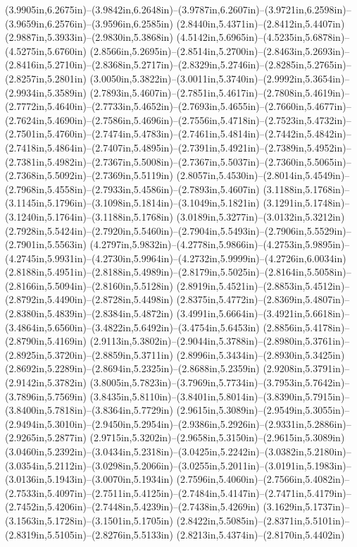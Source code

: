 (3.9905in,6.2675in)--(3.9842in,6.2648in)--(3.9787in,6.2607in)--(3.9721in,6.2598in)--(3.9659in,6.2576in)--(3.9596in,6.2585in) (2.8440in,5.4371in)--(2.8412in,5.4407in) (2.9887in,5.3933in)--(2.9830in,5.3868in) (4.5142in,5.6965in)--(4.5235in,5.6878in)--(4.5275in,5.6760in) (2.8566in,5.2695in)--(2.8514in,5.2700in)--(2.8463in,5.2693in)--(2.8416in,5.2710in)--(2.8368in,5.2717in)--(2.8329in,5.2746in)--(2.8285in,5.2765in)--(2.8257in,5.2801in) (3.0050in,5.3822in)--(3.0011in,5.3740in)--(2.9992in,5.3654in)--(2.9934in,5.3589in) (2.7893in,5.4607in)--(2.7851in,5.4617in)--(2.7808in,5.4619in)--(2.7772in,5.4640in)--(2.7733in,5.4652in)--(2.7693in,5.4655in)--(2.7660in,5.4677in)--(2.7624in,5.4690in)--(2.7586in,5.4696in)--(2.7556in,5.4718in)--(2.7523in,5.4732in)--(2.7501in,5.4760in)--(2.7474in,5.4783in)--(2.7461in,5.4814in)--(2.7442in,5.4842in)--(2.7418in,5.4864in)--(2.7407in,5.4895in)--(2.7391in,5.4921in)--(2.7389in,5.4952in)--(2.7381in,5.4982in)--(2.7367in,5.5008in)--(2.7367in,5.5037in)--(2.7360in,5.5065in)--(2.7368in,5.5092in)--(2.7369in,5.5119in) (2.8057in,5.4530in)--(2.8014in,5.4549in)--(2.7968in,5.4558in)--(2.7933in,5.4586in)--(2.7893in,5.4607in) (3.1188in,5.1768in)--(3.1145in,5.1796in)--(3.1098in,5.1814in)--(3.1049in,5.1821in) (3.1291in,5.1748in)--(3.1240in,5.1764in)--(3.1188in,5.1768in) (3.0189in,5.3277in)--(3.0132in,5.3212in) (2.7928in,5.5424in)--(2.7920in,5.5460in)--(2.7904in,5.5493in)--(2.7906in,5.5529in)--(2.7901in,5.5563in) (4.2797in,5.9832in)--(4.2778in,5.9866in)--(4.2753in,5.9895in)--(4.2745in,5.9931in)--(4.2730in,5.9964in)--(4.2732in,5.9999in)--(4.2726in,6.0034in) (2.8188in,5.4951in)--(2.8188in,5.4989in)--(2.8179in,5.5025in)--(2.8164in,5.5058in)--(2.8166in,5.5094in)--(2.8160in,5.5128in) (2.8919in,5.4521in)--(2.8853in,5.4512in)--(2.8792in,5.4490in)--(2.8728in,5.4498in) (2.8375in,5.4772in)--(2.8369in,5.4807in)--(2.8380in,5.4839in)--(2.8384in,5.4872in) (3.4991in,5.6664in)--(3.4921in,5.6618in)--(3.4864in,5.6560in)--(3.4822in,5.6492in)--(3.4754in,5.6453in) (2.8856in,5.4178in)--(2.8790in,5.4169in) (2.9113in,5.3802in)--(2.9044in,5.3788in)--(2.8980in,5.3761in)--(2.8925in,5.3720in)--(2.8859in,5.3711in) (2.8996in,5.3434in)--(2.8930in,5.3425in) (2.8692in,5.2289in)--(2.8694in,5.2325in)--(2.8688in,5.2359in) (2.9208in,5.3791in)--(2.9142in,5.3782in) (3.8005in,5.7823in)--(3.7969in,5.7734in)--(3.7953in,5.7642in)--(3.7896in,5.7569in) (3.8435in,5.8110in)--(3.8401in,5.8014in)--(3.8390in,5.7915in)--(3.8400in,5.7818in)--(3.8364in,5.7729in) (2.9615in,5.3089in)--(2.9549in,5.3055in)--(2.9494in,5.3010in)--(2.9450in,5.2954in)--(2.9386in,5.2926in)--(2.9331in,5.2886in)--(2.9265in,5.2877in) (2.9715in,5.3202in)--(2.9658in,5.3150in)--(2.9615in,5.3089in) (3.0460in,5.2392in)--(3.0434in,5.2318in)--(3.0425in,5.2242in)--(3.0382in,5.2180in)--(3.0354in,5.2112in)--(3.0298in,5.2066in)--(3.0255in,5.2011in)--(3.0191in,5.1983in)--(3.0136in,5.1943in)--(3.0070in,5.1934in) (2.7596in,5.4060in)--(2.7566in,5.4082in)--(2.7533in,5.4097in)--(2.7511in,5.4125in)--(2.7484in,5.4147in)--(2.7471in,5.4179in)--(2.7452in,5.4206in)--(2.7448in,5.4239in)--(2.7438in,5.4269in) (3.1629in,5.1737in)--(3.1563in,5.1728in)--(3.1501in,5.1705in) (2.8422in,5.5085in)--(2.8371in,5.5101in)--(2.8319in,5.5105in)--(2.8276in,5.5133in) (2.8213in,5.4374in)--(2.8170in,5.4402in) 